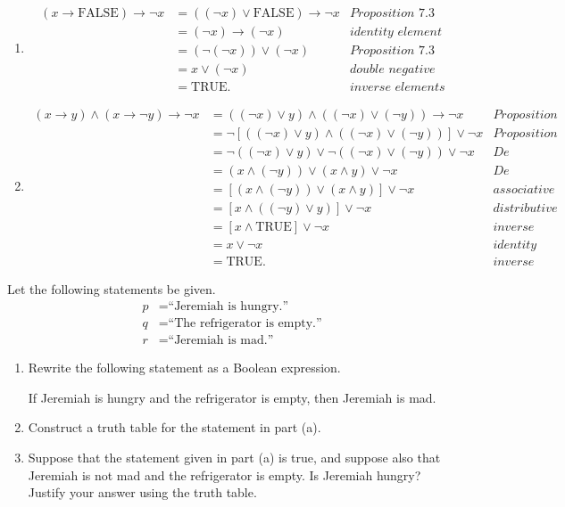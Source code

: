 \documentclass{article}
\theoremstyle{definition}
\begin{document}
\begin{solution}
\begin{enumerate}
\item\begin{align*}
(x\rightarrow\mathrm{FALSE})\rightarrow\lnot x
&=((\lnot x)\lor\mathrm{FALSE})\rightarrow\lnot x&\textit{Proposition 7.3}\\
&=(\lnot x)\rightarrow(\lnot x)&\textit{identity element}\\
&=(\lnot(\lnot x))\lor(\lnot x)&\textit{Proposition 7.3}\\
&=x\lor(\lnot x)&\textit{double negative}\\
&=\mathrm{TRUE}.&\textit{inverse elements}
\end{align*}
\item\begin{align*}
(x\rightarrow y)\land(x\rightarrow\lnot y)\rightarrow\lnot x
&=((\lnot x)\lor y)\land((\lnot x)\lor(\lnot y))\rightarrow\lnot x&\textit{Proposition 7.3}\\
&=\lnot[((\lnot x)\lor y)\land((\lnot x)\lor(\lnot y))]\lor\lnot x&\textit{Proposition 7.3}\\
&=\lnot((\lnot x)\lor y)\lor\lnot((\lnot x)\lor(\lnot y))\lor\lnot x&\textit{De Morgan's law}\\
&=(x\land(\lnot y))\lor(x\land y)\lor\lnot x&\textit{De Morgan's law}\\
&=[(x\land(\lnot y))\lor(x\land y)]\lor\lnot x&\textit{associative property}\\
&=[x\land((\lnot y)\lor y)]\lor\lnot x&\textit{distributive property}\\
&=[x\land\mathrm{TRUE}]\lor\lnot x&\textit{inverse elements}\\
&=x\lor\lnot x&\textit{identity element}\\
&=\mathrm{TRUE}.&\textit{inverse elements}
\end{align*}
\end{enumerate}
\end{solution}
\begin{question}
	Let the following statements be given.
		\begin{align*}
		p &= \text{``Jeremiah is hungry.''}\\
		q &= \text{``The refrigerator is empty.''}\\
		r &= \text{``Jeremiah is mad.''}
		\end{align*}
	\begin{enumerate}
		\item Rewrite the following statement as a Boolean expression.\\
			\begin{center}
			If Jeremiah is hungry and the refrigerator is empty, then Jeremiah is mad.
			\end{center}
		\item Construct a truth table for the statement in part (a).
		\item Suppose that the statement given in part (a) is true, and suppose also that Jeremiah is not mad and the refrigerator is empty. Is Jeremiah hungry? Justify your answer using the truth table.
	\end{enumerate}
\end{question}
\end{document}
